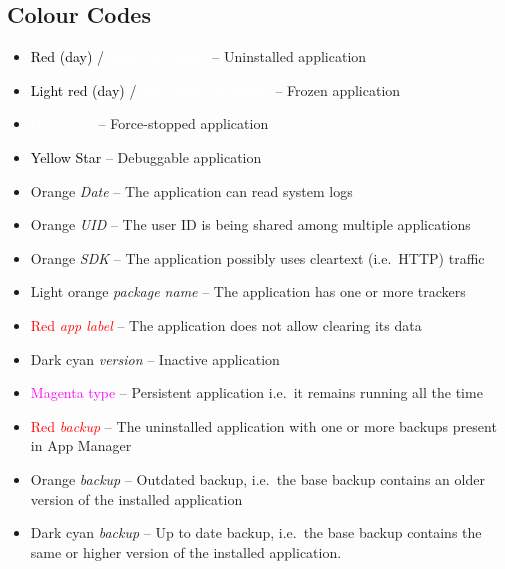 \subsection{Colour Codes}\label{subsec:main-colour-codes} %
\begin{itemize}
    \item \colorbox{uninstalled-day}{\textcolor{black}{Red (day)}} / \colorbox{uninstalled-night}{\textcolor{white}
    {dark red (night)}} -- Uninstalled application
    \item \colorbox{disabled-day}{\textcolor{black}{Light red (day)}} / \colorbox{disabled-night}{\textcolor{white}
    {very dark red (night)}} -- Frozen application
    \item \colorbox{force-stopped}{\textcolor{white}{Dark cyan}} -- Force-stopped application
    \item \colorbox{AMYellow}{\textcolor{black}{Yellow Star}} -- Debuggable application

    \item \textcolor{AMOrange}{Orange \textit{Date}} -- The application can read system logs
    \item \textcolor{AMOrange}{Orange \textit{UID}} -- The user ID is being shared among multiple applications
    \item \textcolor{AMOrange}{Orange \textit{SDK}} -- The application possibly uses cleartext (i.e.\ HTTP) traffic
    \item \textcolor{tracker-day}{Light orange \textit{package name}} -- The application has one or more trackers
    \item \textcolor{red}{Red \textit{app label}} -- The application does not allow clearing its data
    \item \textcolor{AMDarkCyan}{Dark cyan \textit{version}} -- Inactive application
    \item \textcolor{magenta}{Magenta type} -- Persistent application i.e.\ it remains running all the time

    \item \textcolor{red}{Red \textit{backup}} -- The uninstalled application with one or more
    backups present in App Manager
    \item \textcolor{AMOrange}{Orange \textit{backup}} -- Outdated backup, i.e.\ the base backup
    contains an older version of the installed application
    \item \textcolor{AMDarkCyan}{Dark cyan \textit{backup}} -- Up to date backup, i.e.\ the base
    backup contains the same or higher version of the installed application.
\end{itemize}

